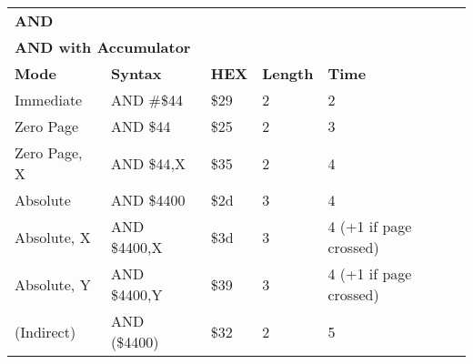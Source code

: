 \begin{table}[H]
\begin{tabular}{p{}p{}p{}p{}p{}}
\multicolumn{5}{p{0.22\textwidth}}{\huge\textbf{AND}}\\
\multicolumn{5}{p{0.9\textwidth}}{\textbf{AND with Accumulator}}\\ \hline
\multicolumn{1}{|p{0.22\textwidth}|}{\textbf{Mode}}&\multicolumn{1}{|p{0.2\textwidth}|}{\textbf{Syntax}}&\multicolumn{1}{|p{0.1\textwidth}|}{\textbf{HEX}}&\multicolumn{1}{|p{0.1\textwidth}|}{\textbf{Length}}&\multicolumn{1}{|p{0.4\textwidth}|}{\textbf{Time}}\\ \hline
\multicolumn{1}{|p{0.22\textwidth}|}{Immediate}&\multicolumn{1}{|p{0.2\textwidth}|}{AND \#\$44}&\multicolumn{1}{|p{0.1\textwidth}|}{\$29}&\multicolumn{1}{|p{0.1\textwidth}|}{2}&\multicolumn{1}{|p{0.4\textwidth}|}{2}\\ \hline
\multicolumn{1}{|p{0.22\textwidth}|}{Zero Page}&\multicolumn{1}{|p{0.2\textwidth}|}{AND \$44}&\multicolumn{1}{|p{0.1\textwidth}|}{\$25}&\multicolumn{1}{|p{0.1\textwidth}|}{2}&\multicolumn{1}{|p{0.4\textwidth}|}{3}\\ \hline
\multicolumn{1}{|p{0.22\textwidth}|}{Zero Page, X}&\multicolumn{1}{|p{0.2\textwidth}|}{AND \$44,X}&\multicolumn{1}{|p{0.1\textwidth}|}{\$35}&\multicolumn{1}{|p{0.1\textwidth}|}{2}&\multicolumn{1}{|p{0.4\textwidth}|}{4}\\ \hline
\multicolumn{1}{|p{0.22\textwidth}|}{Absolute}&\multicolumn{1}{|p{0.2\textwidth}|}{AND \$4400}&\multicolumn{1}{|p{0.1\textwidth}|}{\$2d}&\multicolumn{1}{|p{0.1\textwidth}|}{3}&\multicolumn{1}{|p{0.4\textwidth}|}{4}\\ \hline
\multicolumn{1}{|p{0.22\textwidth}|}{Absolute, X}&\multicolumn{1}{|p{0.2\textwidth}|}{AND \$4400,X}&\multicolumn{1}{|p{0.1\textwidth}|}{\$3d}&\multicolumn{1}{|p{0.1\textwidth}|}{3}&\multicolumn{1}{|p{0.4\textwidth}|}{4 (+1 if page crossed)}\\ \hline
\multicolumn{1}{|p{0.22\textwidth}|}{Absolute, Y}&\multicolumn{1}{|p{0.2\textwidth}|}{AND \$4400,Y}&\multicolumn{1}{|p{0.1\textwidth}|}{\$39}&\multicolumn{1}{|p{0.1\textwidth}|}{3}&\multicolumn{1}{|p{0.4\textwidth}|}{4 (+1 if page crossed)}\\ \hline
\multicolumn{1}{|p{0.22\textwidth}|}{(Indirect)}&\multicolumn{1}{|p{0.2\textwidth}|}{AND (\$4400)}&\multicolumn{1}{|p{0.1\textwidth}|}{\$32}&\multicolumn{1}{|p{0.1\textwidth}|}{2}&\multicolumn{1}{|p{0.4\textwidth}|}{5}\\ \hline

\end{tabular}
\end{table}
